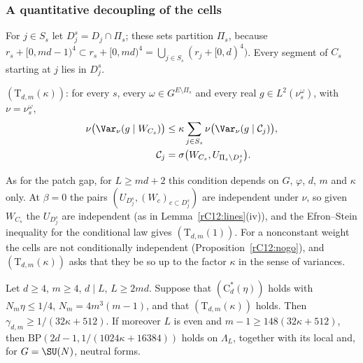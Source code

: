 \subsubsection{A quantitative decoupling of the cells}

For $j\in S_s$ let $D^s_j=D_j\cap\Pi_s$; these sets partition $\Pi_s$,
because $r_s+[0,md-1)^4\subset r_s+[0,md)^4=\bigcup_{j\in S_s}(r_j+
[0,d)^4)$. Every segment of $C_s$ starting at $j$ lies in $D^s_j$.

\begin{definition}\label{rC12:T}
$(\mathrm T_{d,m}(\kappa))$: for every $s$, every $\omega\in G^{E\setminus
\Pi_s}$ and every real $g\in L^2(\nu^\omega_s)$, with $\nu=\nu^\omega_s$,
\[
\begin{split}
\nu\bigl(\Var_\nu(g\mid W_{C_s})\bigr)&\le\kappa\sum_{j\in S_s}\nu\bigl(
\Var_\nu(g\mid\mathcal C_j)\bigr),\\
\mathcal C_j&=\sigma\bigl(W_{C_s},U_{\Pi_s\setminus D^s_j}\bigr).
\end{split}
\]
\end{definition}

As for the patch gap, for $L\ge md+2$ this condition depends on $G$,
$\varphi$, $d$, $m$ and $\kappa$ only. At $\beta=0$ the pairs $(U_{D^s_j},
(W_c)_{c\subset D^s_j})$ are independent under $\nu$, so given $W_{C_s}$ the
$U_{D^s_j}$ are independent (as in Lemma~\ref{rC12:lines}(iv)), and the
Efron--Stein inequality for the conditional law gives
$(\mathrm T_{d,m}(1))$. For a nonconstant weight the cells are not
conditionally independent (Proposition~\ref{rC12:nogo}), and
$(\mathrm T_{d,m}(\kappa))$ asks that they be so up to the factor
$\kappa$ in the sense of variances.

\begin{theorem}\label{rC12:reduction}
Let $d\ge4$, $m\ge4$, $d\mid L$, $L\ge2md$. Suppose that
$(\mathrm C^*_d(\eta))$ holds with $N_m\eta\le1/4$, $N_m=4m^3(m-1)$, and
that $(\mathrm T_{d,m}(\kappa))$ holds. Then $\gamma_{d,m}\ge1/(32\kappa+
512)$. If moreover $L$ is even and $m-1\ge148(32\kappa+512)$, then
$\mathrm{BP}(2d-1,1/(1024\kappa+16384))$ holds on $\Lambda_L$, together with
its local and, for $G=\SU(N)$, neutral forms.
\end{theorem}

